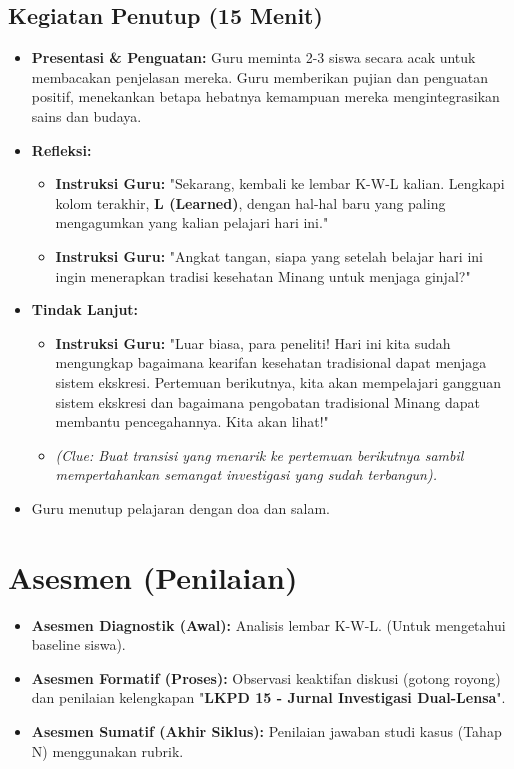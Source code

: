 \documentclass[a4paper,12pt]{article}
\begin{document}
\subsection{Kegiatan Penutup (15 Menit)}
\begin{itemize}
\item \textbf{Presentasi \& Penguatan:} Guru meminta 2-3 siswa secara acak untuk membacakan penjelasan mereka. Guru memberikan pujian dan penguatan positif, menekankan betapa hebatnya kemampuan mereka mengintegrasikan sains dan budaya.
\item \textbf{Refleksi:}
    \begin{itemize}
    \item \textbf{Instruksi Guru:} "Sekarang, kembali ke lembar K-W-L kalian. Lengkapi kolom terakhir, \textbf{L (Learned)}, dengan hal-hal baru yang paling mengagumkan yang kalian pelajari hari ini."
    \item \textbf{Instruksi Guru:} "Angkat tangan, siapa yang setelah belajar hari ini ingin menerapkan tradisi kesehatan Minang untuk menjaga ginjal?"
    \end{itemize}
\item \textbf{Tindak Lanjut:}
    \begin{itemize}
    \item \textbf{Instruksi Guru:} "Luar biasa, para peneliti! Hari ini kita sudah mengungkap bagaimana kearifan kesehatan tradisional dapat menjaga sistem ekskresi. Pertemuan berikutnya, kita akan mempelajari gangguan sistem ekskresi dan bagaimana pengobatan tradisional Minang dapat membantu pencegahannya. Kita akan lihat!"
    \item \textit{(Clue: Buat transisi yang menarik ke pertemuan berikutnya sambil mempertahankan semangat investigasi yang sudah terbangun).}
    \end{itemize}
\item Guru menutup pelajaran dengan doa dan salam.
\end{itemize}

\section{Asesmen (Penilaian)}

\begin{itemize}
\item \textbf{Asesmen Diagnostik (Awal):} Analisis lembar K-W-L. (Untuk mengetahui baseline siswa).
\item \textbf{Asesmen Formatif (Proses):} Observasi keaktifan diskusi (gotong royong) dan penilaian kelengkapan "\textbf{LKPD 15 - Jurnal Investigasi Dual-Lensa}".
\item \textbf{Asesmen Sumatif (Akhir Siklus):} Penilaian jawaban studi kasus (Tahap N) menggunakan rubrik.
\end{itemize}
\end{document}
